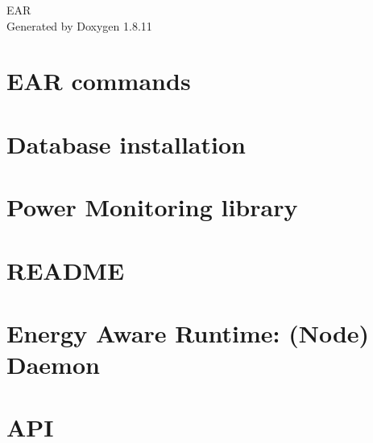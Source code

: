 \documentclass[twoside]{book}
\newcommand{\+}{\discretionary{\mbox{\scriptsize$\hookleftarrow$}}{}{}}
\newcommand{\clearemptydoublepage}{%
  \newpage{\pagestyle{empty}\cleardoublepage}%
}
\begin{document}
\hypersetup{pageanchor=false,
             bookmarksnumbered=true,
             pdfencoding=unicode
            }
\begin{titlepage}
\vspace*{7cm}
\begin{center}%
{\Large E\+AR }\\
\vspace*{1cm}
{\large Generated by Doxygen 1.8.11}\\
\end{center}
\end{titlepage}
\clearemptydoublepage
\tableofcontents
\clearemptydoublepage
{}
\hypersetup{pageanchor=true}

\chapter{E\+AR commands}
\label{md_src_commands_README}
\hypertarget{md_src_commands_README}{}

\chapter{Database installation}
\label{md_src_common_database_README}
\hypertarget{md_src_common_database_README}{}

\chapter{Power Monitoring library}
\label{md_src_common_README.dev}
\hypertarget{md_src_common_README.dev}{}

\chapter{R\+E\+A\+D\+ME}
\label{md_src_daemon_README.dev}
\hypertarget{md_src_daemon_README.dev}{}

\chapter{Energy Aware Runtime\+: (Node) Daemon}
\label{md_src_daemon_README}
\hypertarget{md_src_daemon_README}{}

\chapter{A\+PI}
\label{md_src_database_cache_README.dev}
\hypertarget{md_src_database_cache_README.dev}{}

\end{document}
